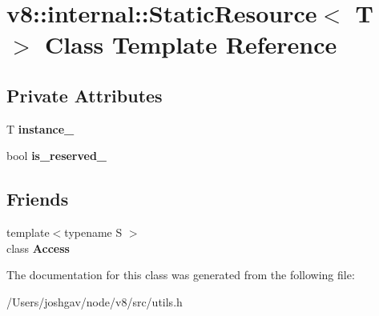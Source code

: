\hypertarget{classv8_1_1internal_1_1_static_resource}{}\section{v8\+:\+:internal\+:\+:Static\+Resource$<$ T $>$ Class Template Reference}
\label{classv8_1_1internal_1_1_static_resource}
\subsection*{Private Attributes}
\begin{DoxyCompactItemize}
\item 
T {\bfseries instance\+\_\+}\hypertarget{classv8_1_1internal_1_1_static_resource_a3fa2205678df24ebee33b4d8a86ae628}{}\label{classv8_1_1internal_1_1_static_resource_a3fa2205678df24ebee33b4d8a86ae628}

\item 
bool {\bfseries is\+\_\+reserved\+\_\+}\hypertarget{classv8_1_1internal_1_1_static_resource_aea80d34de6a4f903a245d053d488ff1b}{}\label{classv8_1_1internal_1_1_static_resource_aea80d34de6a4f903a245d053d488ff1b}

\end{DoxyCompactItemize}
\subsection*{Friends}
\begin{DoxyCompactItemize}
\item 
{\footnotesize template$<$typename S $>$ }\\class {\bfseries Access}\hypertarget{classv8_1_1internal_1_1_static_resource_a82b51203b782e017f007b283bb1515db}{}\label{classv8_1_1internal_1_1_static_resource_a82b51203b782e017f007b283bb1515db}

\end{DoxyCompactItemize}


The documentation for this class was generated from the following file\+:\begin{DoxyCompactItemize}
\item 
/\+Users/joshgav/node/v8/src/utils.\+h\end{DoxyCompactItemize}
